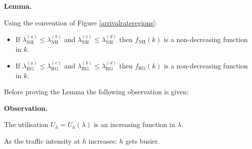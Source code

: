 \documentclass{article}
\newcommand{\NH}{\text{NH}}
\newcommand{\RG}{\text{RG}}
\begin{document}
\textbf{Lemma.}

Using the convention of Figure \ref{arrivalrateregions}:

\begin{itemize}

\item If $\lambda_{\NH}^{(a)}\leq \lambda_{\NH}^{(b)}$ and $\lambda_{\NH}^{(c)}\leq \lambda_{\NH}^{(d)}$ then $f_{\NH}(k)$ is a non-decreasing function in $k$.
\item If $\lambda_{\RG}^{(a)}\leq \lambda_{\RG}^{(c)}$ and $\lambda_{\RG}^{(b)}\leq \lambda_{\RG}^{(d)}$ then $f_{\RG}(k)$ is a non-decreasing function in $k$.

\end{itemize}

Before proving the Lemma the following observation is given:

\textbf{Observation.}

The utilisation $U_h=U_h(\lambda)$ is an increasing function in $\lambda$.

\begin{center}
As the traffic intensity at $h$ increases: $h$ gets busier.
\end{center}
\end{document}
